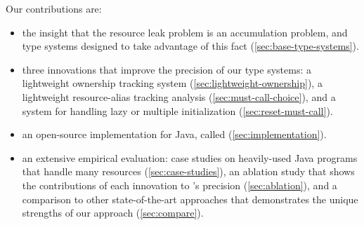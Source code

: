 Our contributions are:
\begin{itemize}
\item the insight that the resource leak problem is an accumulation
  problem, and
  type systems designed to take advantage
  of this fact (\cref{sec:base-type-systems}).
\item three
  innovations that improve the precision of our type
  systems: a lightweight ownership tracking system
  (\cref{sec:lightweight-ownership}), a lightweight resource-alias
  tracking analysis (\cref{sec:must-call-choice}), and a system for
  handling lazy or multiple initialization (\cref{sec:reset-must-call}).
\item an open-source implementation for Java,
  called \Tool (\cref{sec:implementation}).
\item an extensive empirical evaluation: case studies on heavily-used
  Java programs that handle many resources (\cref{sec:case-studies}),
  an ablation study that shows the contributions of each innovation to
  \Tool's precision (\cref{sec:ablation}), and a comparison to
  other state-of-the-art approaches that demonstrates the unique strengths
  of our approach (\cref{sec:compare}).
\end{itemize}
  


